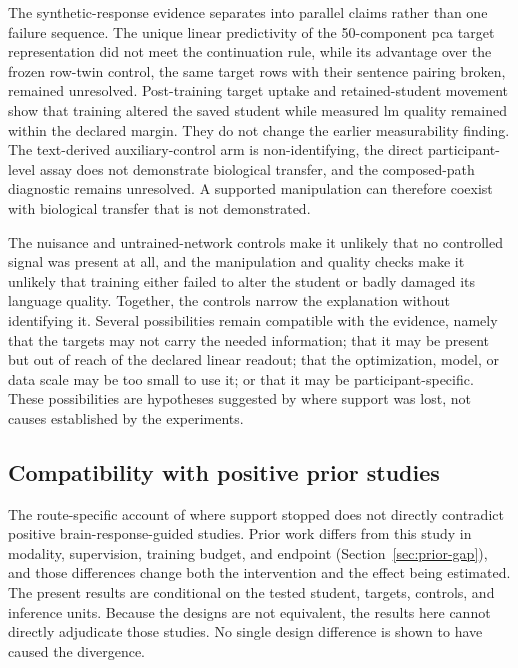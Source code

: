 The synthetic-response evidence separates into parallel claims rather than one failure sequence.
The unique linear predictivity of the 50-component \ac{pca} target representation did not meet the continuation rule, while its advantage over the frozen row-twin control, the same target rows with their sentence pairing broken, remained unresolved.
Post-training target uptake and retained-student movement show that training altered the saved student while measured \ac{lm} quality remained within the declared margin.
They do not change the earlier measurability finding.
The text-derived auxiliary-control arm is non-identifying, the direct participant-level assay does not demonstrate biological transfer, and the composed-path diagnostic remains unresolved.
A supported manipulation can therefore coexist with biological transfer that is not demonstrated.

The nuisance and untrained-network controls make it unlikely that no controlled signal was present at all, and the manipulation and quality checks make it unlikely that training either failed to alter the student or badly damaged its language quality.
Together, the controls narrow the explanation without identifying it.
Several possibilities remain compatible with the evidence, namely that the targets may not carry the needed information; that it may be present but out of reach of the declared linear readout; that the optimization, model, or data scale may be too small to use it; or that it may be participant-specific.
These possibilities are hypotheses suggested by where support was lost, not causes established by the experiments.

\subsection{Compatibility with positive prior studies}
\label{sec:discussion-prior}

The route-specific account of where support stopped does not directly contradict positive brain-response-guided studies.
Prior work differs from this study in modality, supervision, training budget, and endpoint (Section~\ref{sec:prior-gap}), and those differences change both the intervention and the effect being estimated.
The present results are conditional on the tested student, targets, controls, and inference units.
Because the designs are not equivalent, the results here cannot directly adjudicate those studies.
No single design difference is shown to have caused the divergence.

